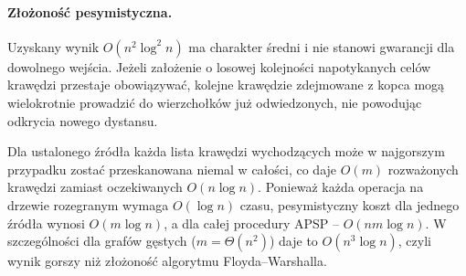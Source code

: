 \paragraph{Złożoność pesymistyczna.} Uzyskany wynik $O(n^2 \log^2 n)$ ma charakter średni i nie stanowi gwarancji dla dowolnego wejścia. Jeżeli założenie o losowej kolejności napotykanych celów krawędzi przestaje obowiązywać, kolejne krawędzie zdejmowane z kopca mogą wielokrotnie prowadzić do wierzchołków już odwiedzonych, nie powodując odkrycia nowego dystansu.

Dla ustalonego źródła każda lista krawędzi wychodzących może w najgorszym przypadku zostać przeskanowana niemal w całości, co daje $O(m)$ rozważonych krawędzi zamiast oczekiwanych $O(n \log n)$. Ponieważ każda operacja na drzewie rozegranym wymaga $O(\log n)$ czasu, pesymistyczny koszt dla jednego źródła wynosi $O(m \log n)$, a dla całej procedury APSP -- $O(nm \log n)$. W szczególności dla grafów gęstych ($m = \Theta(n^2)$) daje to $O(n^3 \log n)$, czyli wynik gorszy niż złożoność algorytmu Floyda--Warshalla.

\newpage